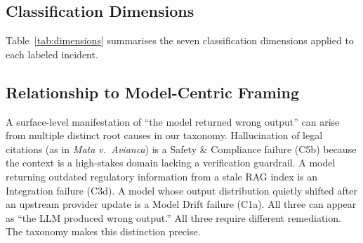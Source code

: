 \documentclass{article}
\begin{document}
\subsection{Classification Dimensions}

Table~\ref{tab:dimensions} summarises the seven classification dimensions
applied to each labeled incident.

\begin{table}[t]
\caption{Taxonomy classification dimensions.}
\label{tab:dimensions}
\centering
\small
{}
\end{table}

\subsection{Relationship to Model-Centric Framing}

A surface-level manifestation of ``the model returned wrong output'' can arise
from multiple distinct root causes in our taxonomy.  Hallucination of legal
citations (as in \emph{Mata v.\ Avianca}) is a Safety \& Compliance failure
(C5b) because the context is a high-stakes domain lacking a verification
guardrail.  A model returning outdated regulatory information from a stale RAG
index is an Integration failure (C3d).  A model whose output distribution
quietly shifted after an upstream provider update is a Model Drift failure (C1a).
All three can appear as ``the LLM produced wrong output.'' All three require
different remediation.  The taxonomy makes this distinction precise.

\end{document}
